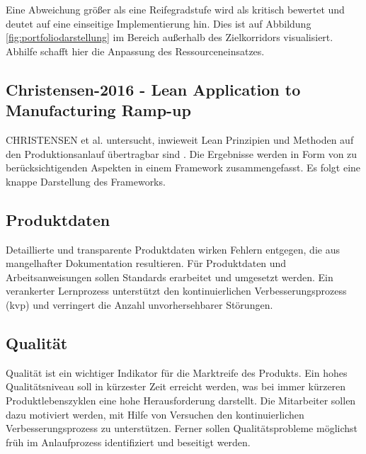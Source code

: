 Eine Abweichung größer als eine Reifegradstufe wird als kritisch bewertet und deutet auf eine einseitige Implementierung hin. Dies ist auf Abbildung \ref{fig:portfoliodarstellung} im Bereich außerhalb des Zielkorridors visualisiert.  Abhilfe schafft hier die Anpassung des Ressourceneinsatzes. 


\subsection*{Christensen-2016 - Lean Application to Manufacturing Ramp-up}\label{sec:christensen}
CHRISTENSEN et al. untersucht, inwieweit Lean Prinzipien und Methoden auf den Produktionsanlauf übertragbar sind \autocite{Christensen2016}. 
Die Ergebnisse werden in Form von zu berücksichtigenden Aspekten in einem Framework zusammengefasst. Es folgt eine knappe Darstellung des Frameworks. 

\subsection*{Produktdaten}
Detaillierte und transparente Produktdaten wirken Fehlern entgegen, die aus mangelhafter Dokumentation resultieren. 
Für Produktdaten und Arbeitsanweisungen sollen Standards erarbeitet und umgesetzt werden. Ein verankerter Lernprozess unterstützt den kontinuierlichen Verbesserungsprozess (\gls{kvp}) und verringert die Anzahl unvorhersehbarer Störungen. 


\subsection*{Qualität}
Qualität ist ein wichtiger Indikator für die Marktreife des Produkts. Ein hohes Qualitätsniveau soll in kürzester Zeit erreicht werden, was bei immer kürzeren Produktlebenszyklen eine hohe Herausforderung darstellt. 
%
Die Mitarbeiter sollen dazu motiviert werden, mit Hilfe von Versuchen den kontinuierlichen Verbesserungsprozess zu unterstützen. Ferner sollen Qualitätsprobleme möglichst früh im Anlaufprozess identifiziert und beseitigt werden. 

